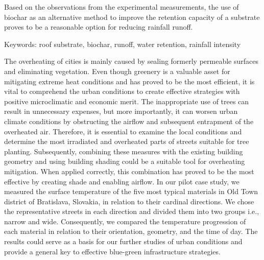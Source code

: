 Based on the observations from the experimental measurements, the use of biochar as an alternative method to improve the retention capacity of a substrate proves to be a reasonable option for reducing rainfall runoff.

Keywords: roof substrate, biochar, runoff, water retention, rainfall intensity 
\newpage{}
{}
\begin{flushleft}





\end{flushleft}

\noindent

The overheating of cities is mainly caused by sealing formerly permeable surfaces and eliminating vegetation. Even though greenery is a valuable asset for mitigating extreme heat conditions and has proved to be the most efficient, it is vital to comprehend the urban conditions to create effective strategies with positive microclimatic and economic merit. The inappropriate use of trees can result in unnecessary expenses, but more importantly, it can worsen urban climate conditions by obstructing the airflow and subsequent entrapment of the overheated air. Therefore, it is essential to examine the local conditions and determine the most irradiated and overheated parts of streets suitable for tree planting. Subsequently, combining these measures with the existing building geometry and using building shading could be a suitable tool for overheating mitigation. When applied correctly, this combination has proved to be the most effective by creating shade and enabling airflow. In our pilot case study, we measured the surface temperature of the five most typical materials in Old Town district of Bratislava, Slovakia, in relation to their cardinal directions. We chose the representative streets in each direction and divided them into two groups i.e., narrow and wide. Consequently, we compared the temperature progression of each material in relation to their orientation, geometry, and the time of day. The results could serve as a basis for our further studies of urban conditions and provide a general key to effective blue-green infrastructure strategies.

